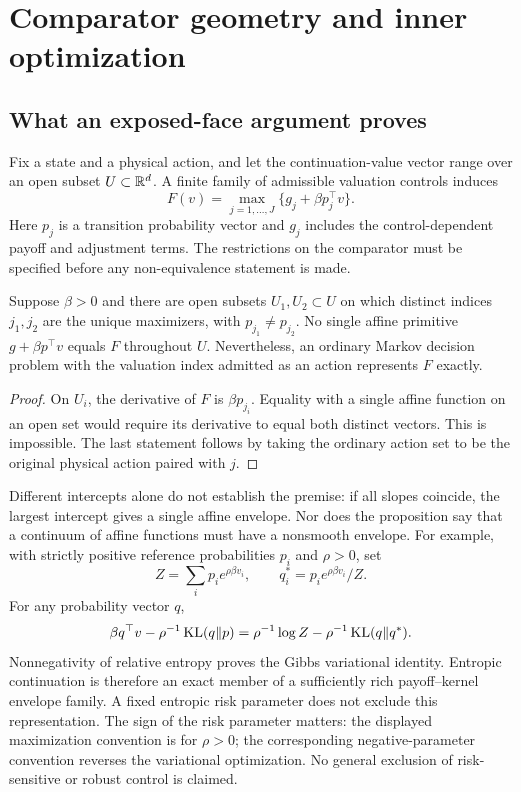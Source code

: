 \section{Comparator geometry and inner optimization}\label{ec:geometry}
\subsection{What an exposed-face argument proves}
Fix a state and a physical action, and let the continuation-value vector range over an open subset $U\subset\mathbb R^d$. A finite family of admissible valuation controls induces
\begin{equation}
 F(v)=\max_{j=1,\ldots,J}\{g_j+\beta p_j^\top v\}.
\end{equation}
Here $p_j$ is a transition probability vector and $g_j$ includes the control-dependent payoff and adjustment terms. The restrictions on the comparator must be specified before any non-equivalence statement is made.
\begin{proposition}
Suppose $\beta>0$ and there are open subsets $U_1,U_2\subset U$ on which distinct indices $j_1,j_2$ are the unique maximizers, with $p_{j_1}\ne p_{j_2}$. No single affine primitive $g+\beta p^\top v$ equals $F$ throughout $U$. Nevertheless, an ordinary Markov decision problem with the valuation index admitted as an action represents $F$ exactly.
\end{proposition}
\begin{proof}
On $U_i$, the derivative of $F$ is $\beta p_{j_i}$. Equality with a single affine function on an open set would require its derivative to equal both distinct vectors. This is impossible. The last statement follows by taking the ordinary action set to be the original physical action paired with $j$.
\end{proof}
Different intercepts alone do not establish the premise: if all slopes coincide, the largest intercept gives a single affine envelope. Nor does the proposition say that a continuum of affine functions must have a nonsmooth envelope. For example, with strictly positive reference probabilities $p_i$ and $\rho>0$, set
\[
 Z=\sum_i p_i e^{\rho\beta v_i},\qquad q_i^*=p_i e^{\rho\beta v_i}/Z.
\]
For any probability vector $q$,
\begin{equation}
 \beta q^\top v-\rho^{-1}\operatorname{KL}(q\Vert p)
 =\rho^{-1}\log Z-\rho^{-1}\operatorname{KL}(q\Vert q^*).
\end{equation}
Nonnegativity of relative entropy proves the Gibbs variational identity. Entropic continuation is therefore an exact member of a sufficiently rich payoff--kernel envelope family. A fixed entropic risk parameter does not exclude this representation. The sign of the risk parameter matters: the displayed maximization convention is for $\rho>0$; the corresponding negative-parameter convention reverses the variational optimization. No general exclusion of risk-sensitive or robust control is claimed.

